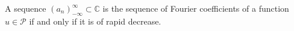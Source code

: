 \begin{theorem}
A sequence $(a_n)_{-\infty}^{\infty} \subset \mathbb{C}$ is the sequence of Fourier coefficients of a function $u \in \mathcal{P}$ if and only if it is of rapid decrease.
\end{theorem}
